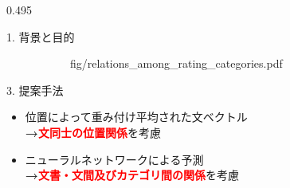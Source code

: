 \documentclass[unicode,10pt]{beamer}
\newcommand{\mycolumnwidth}{0.495\textwidth}
\newcommand{\arrow}{\textcolor{ttiblue}{\textbf{→}}\hspace{1ex}}
\newcommand{\itemtitle}[1]{\textbf{#1}\\}
\newcommand{\fire}[1]{\textcolor{red}{\textbf{#1}}}
\begin{document}
\begin{frame}
\begin{columns}[onlytextwidth,t]
\begin{column}{\mycolumnwidth}
\begin{block}{1. 背景と目的}
\begin{figure}
\begin{subfigure}[t]{0.5\linewidth}
                        {fig/relations_among_rating_categories.pdf}
      \end{subfigure}
      \hspace*{\fill} %
    \end{figure}
  \end{block}

  \begin{block}{3. 提案手法}
        \begin{itemize}
          \item 位置によって重み付け平均された文ベクトル \\
                \arrow \fire{文同士の位置関係}を考慮
          \item ニューラルネットワークによる予測 \\
                \arrow \fire{文書・文間及びカテゴリ間の関係}を考慮
        \end{itemize}
    \begin{figure}

\end{figure}
\end{block}
\end{column}
\end{columns}
\end{frame}
\end{document}
